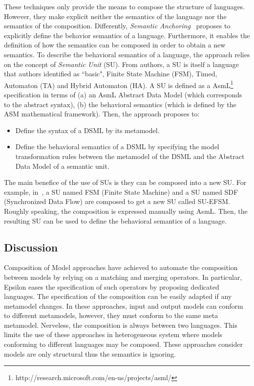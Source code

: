 These techniques only provide the means to compose the structure of languages. However, they make explicit neither the semantics of the language nor the semantics of the composition. Differently, \emph{Semantic Anchoring}~\cite{semanticsanchoring} proposes to explicitly define the behavior semantics of a language. Furthermore, it enables the definition of how the semantics can be composed in order to obtain a new semantics. To describe the behavioral semantics of a language, the approach relies on the concept of \emph{Semantic Unit} (SU). From authors, a SU is itself a language that authors identified as ``basic", \eg Finite State Machine (FSM), Timed, Automaton (TA) and Hybrid Automaton (HA). A SU is defined as a AsmL\footnote{http://research.microsoft.com/en-us/projects/asml/} specification in terms of (a) an AsmL Abstract Data Model (which corresponds to the abstract syntax), (b) the behavioral semantics (which is defined by the ASM mathematical framework). Then, the approach proposes to:
\begin{itemize}
	\item Define the syntax of a DSML by its metamodel. 
	\item Define the behavioral semantics of a DSML by specifying the model transformation rules between the metamodel of the DSML and the Abstract Data Model of a semantic unit. 
\end{itemize}    
The main benefice of the use of SUs is they can be composed into a new SU. For example, in~\cite{composemanticanch}, a SU named FSM (Finite State Machine) and a SU named SDF (Synchronized Data Flow) are composed to get a new SU called SU-EFSM. Roughly speaking, the composition is expressed manually using AsmL. Then, the resulting SU can be used to define the behavioral semantics of a language.

\subsection{Discussion}
Composition of Model approaches have achieved to automate the composition between models by relying on a matching and merging operators. In particular, Epsilon eases the specification of such operators by proposing dedicated languages. The specification of the composition can be easily adapted if any metamodel changes. In these approaches, input and output models can conform to different metamodels, however, they must conform to the same meta metamodel. Nerveless, the composition is always between two languages. This limits the use of these approaches in heterogeneous system where models conforming to different languages may be composed. These approaches consider models are only structural thus the semantics is ignoring.     

